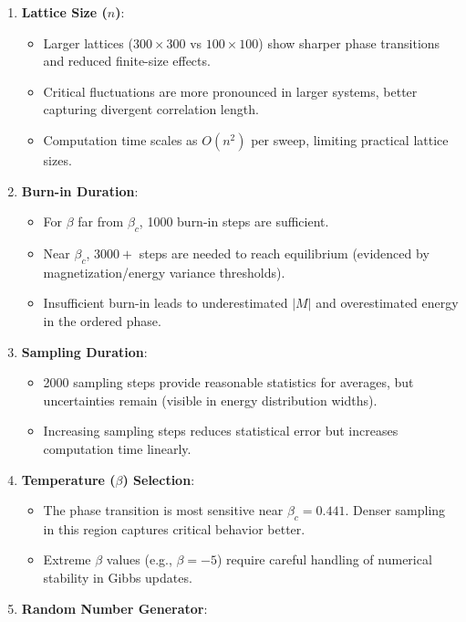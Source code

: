 \documentclass[11pt]{article}
\providecommand{\tightlist}{%
      \setlength{\itemsep}{0pt}\setlength{\parskip}{0pt}}
\begin{document}
\begin{enumerate}
\def\labelenumi{\arabic{enumi}.}
\item
  \textbf{Lattice Size (\(n\))}:

  \begin{itemize}
  \tightlist
  \item
    Larger lattices (\(300\times300\) vs \(100\times100\)) show sharper
    phase transitions and reduced finite-size effects.
  \item
    Critical fluctuations are more pronounced in larger systems, better
    capturing divergent correlation length.
  \item
    Computation time scales as \(O(n^2)\) per sweep, limiting practical
    lattice sizes.
  \end{itemize}
\item
  \textbf{Burn-in Duration}:

  \begin{itemize}
  \tightlist
  \item
    For \(\beta\) far from \(\beta_c\), 1000 burn-in steps are
    sufficient.
  \item
    Near \(\beta_c\), \(3000+\) steps are needed to reach equilibrium
    (evidenced by magnetization/energy variance thresholds).
  \item
    Insufficient burn-in leads to underestimated \(|M|\) and
    overestimated energy in the ordered phase.
  \end{itemize}
\item
  \textbf{Sampling Duration}:

  \begin{itemize}
  \tightlist
  \item
    2000 sampling steps provide reasonable statistics for averages, but
    uncertainties remain (visible in energy distribution widths).
  \item
    Increasing sampling steps reduces statistical error but increases
    computation time linearly.
  \end{itemize}
\item
  \textbf{Temperature (\(\beta\)) Selection}:

  \begin{itemize}
  \tightlist
  \item
    The phase transition is most sensitive near \(\beta_c=0.441\).
    Denser sampling in this region captures critical behavior better.
  \item
    Extreme \(\beta\) values (e.g., \(\beta=-5\)) require careful
    handling of numerical stability in Gibbs updates.
  \end{itemize}
\item
  \textbf{Random Number Generator}:


\end{enumerate}
\end{document}
